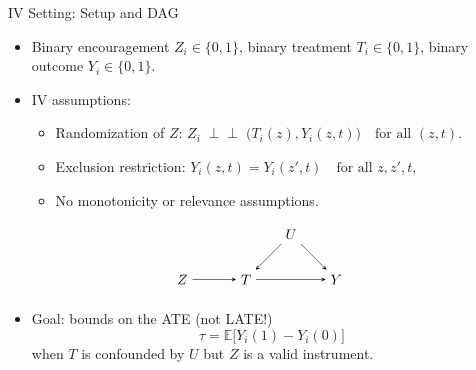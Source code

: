 \documentclass[10pt]{beamer}
\theoremstyle{plain}
\begin{document}
\begin{frame}{IV Setting: Setup and DAG}
  \small
  \begin{itemize}
    \item Binary encouragement $Z_i \in \{0,1\}$, binary treatment $T_i \in \{0,1\}$, binary outcome $Y_i \in \{0,1\}$.
    \pause
    \item IV assumptions:
    \begin{itemize}
      \item Randomization of $Z$: $Z_i \;\perp\!\!\!\perp\; \bigl(T_i(z), Y_i(z,t)\bigr)
        \quad \text{for all } (z,t).$
      \item Exclusion restriction: $ Y_i(z,t) = Y_i(z',t) \quad \text{for all } z,z',t$,
      \item No monotonicity or relevance assumptions.
    \end{itemize}
  \end{itemize}
  \vspace{0.5em}
  \centering
  \[
\begin{tikzpicture}[>=stealth, node distance=1.6cm]
  \node (U) {$U$};
  \node[below right of=U] (Y) {$Y$};
  \node[below left of=U] (T) {$T$};
  \node[left of=T] (Z) {$Z$};
  \draw[->] (U) -- (T);
  \draw[->] (U) -- (Y);
  \draw[->] (T) -- (Y);
  \draw[->] (Z) -- (T);
\end{tikzpicture}
\]
  \vspace{0.5em}
\pause
  \begin{itemize}
    \item Goal: bounds on the ATE (not LATE!)
    \[
      \tau = \mathbb{E}\bigl[ Y_i(1) - Y_i(0) \bigr]
    \]
    when $T$ is confounded by $U$ but $Z$ is a valid instrument.
  \end{itemize}
\end{frame}
\end{document}
